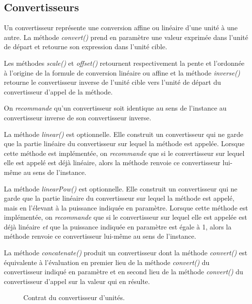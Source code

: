 \documentclass[a4paper,draft,twoside,10pt]{article}
\begin{document}
\subsection{Convertisseurs}

Un convertisseur représente une conversion affine ou linéaire d'une unité à une autre. La méthode \emph{convert()} prend
en paramètre une valeur exprimée dans l'unité de départ et retourne son expression dans l'unité cible.

Les méthodes \emph{scale()} et \emph{offset()} retournent respectivement la pente et l'ordonnée à l'origine de la
formule de conversion linéaire ou affine et la méthode \emph{inverse()} retourne le convertisseur inverse de l'unité 
cible vers l'unité de départ du convertisseur d'appel de la méthode.

On \emph{recommande} qu'un convertisseur soit identique au sens de l'instance au convertisseur inverse de son 
convertisseur inverse.

La méthode \emph{linear()} est optionnelle. Elle construit un convertisseur qui ne garde que la partie linéaire du
convertisseur sur lequel la méthode est appelée. Lorsque cette méthode est implémentée, on \emph{recommande} que si le
convertisseur sur lequel elle est appelé est déjà linéaire, alors la méthode renvoie ce convertisseur lui-même au sens
de l'instance.

La méthode \emph{linearPow()} est optionnelle. Elle construit un convertisseur qui ne garde que la partie linéaire du
convertisseur sur lequel la méthode est appelé, mais en l'élevant à la puissance indiquée en paramètre. Lorsque cette
méthode est implémentée, on \emph{recommande} que si le convertisseur sur lequel elle est appelée est déjà linéaire
\emph{et} que la puissance indiquée en paramètre est égale à 1, alors la méthode renvoie ce convertisseur lui-même au
sens de l'instance.

La méthode \emph{concatenate()} produit un convertisseur dont la méthode \emph{convert()} est équivalente à l'évaluation
en premier lieu de la méthode \emph{convert()} du convertisseur indiqué en paramètre et en second lieu de la méthode
\emph{convert()} du convertisseur d'appel sur la valeur qui en résulte.

\begin{figure}[!h]
\caption{Contrat du convertisseur d'unités.}
\end{figure}
\end{document}
